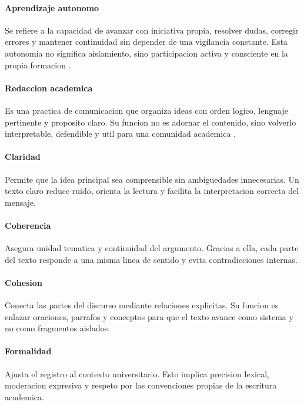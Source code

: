 \documentclass[
	spanish,
	letterpaper, oneside
]{article}
\begin{document}
\paragraph{Aprendizaje autonomo}
Se refiere a la capacidad de avanzar con iniciativa propia, resolver dudas, corregir errores y mantener continuidad sin depender de una vigilancia constante. Esta autonomia no significa aislamiento, sino participacion activa y consciente en la propia formacion \citep{correaManualBasicoEscritura2018}.

\paragraph{Redaccion academica}
Es una practica de comunicacion que organiza ideas con orden logico, lenguaje pertinente y proposito claro. Su funcion no es adornar el contenido, sino volverlo interpretable, defendible y util para una comunidad academica \citep{nunezcortesEscrituraAcademicaTeoria2015}.

\paragraph{Claridad}
Permite que la idea principal sea comprensible sin ambiguedades innecesarias. Un texto claro reduce ruido, orienta la lectura y facilita la interpretacion correcta del mensaje.

\paragraph{Coherencia}
Asegura unidad tematica y continuidad del argumento. Gracias a ella, cada parte del texto responde a una misma linea de sentido y evita contradicciones internas.

\paragraph{Cohesion}
Conecta las partes del discurso mediante relaciones explicitas. Su funcion es enlazar oraciones, parrafos y conceptos para que el texto avance como sistema y no como fragmentos aislados.

\paragraph{Formalidad}
Ajusta el registro al contexto universitario. Esto implica precision lexical, moderacion expresiva y respeto por las convenciones propias de la escritura academica.
\end{document}
